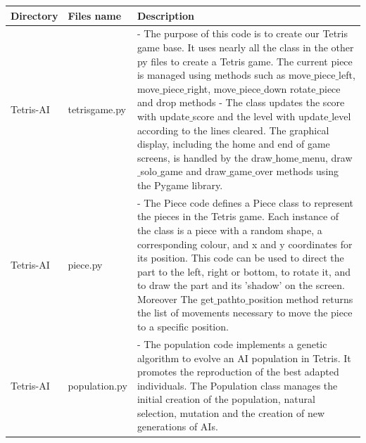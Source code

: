 \documentclass[conference]{IEEEtran}
\begin{document}
\begin{center}
\begin{tabular}{  | m{1.3cm} | m{1.7cm} | m{4.7cm} | } 
    \hline
     Directory & Files name & Description \\
    \hline
    Tetris-AI & 
    tetrisgame.py & 
    - The purpose of this code is to create our Tetris game base. It uses nearly all the  class in the other py files to create a Tetris game. The current piece is managed using methods such as move$\_$piece$\_$left, move$\_$piece$\_$right, move$\_$piece$\_$down  rotate$\_$piece and drop methods
    \newline- The class updates the score with update$\_$score and the level with update$\_$level according to the lines cleared. The graphical display, including the home and end of game screens, is handled by the draw$\_$home$\_$menu, draw$\_$solo$\_$game and draw$\_$game$\_$over methods using the Pygame\cite{b4} library. \\
     \hline
     Tetris-AI &
    piece.py & 
    - The Piece code defines a Piece class to represent the pieces in the Tetris game. Each instance of the class is a piece with a random shape, a corresponding colour, and x and y coordinates for its position. This code can be used to direct the part to the left, right or bottom, to rotate it, and to draw the part and its 'shadow' on the screen. Moreover The get$\_$pathto$\_$position method returns the list of movements necessary to move the piece to a specific position.\\
     \hline
    Tetris-AI & 
    population.py &
    - The population code implements a genetic algorithm to evolve an AI population in Tetris. It promotes the reproduction of the best adapted individuals. The Population class manages the initial creation of the population, natural selection, mutation and the creation of new generations of AIs.  
     
\end{tabular}
\end{center}
\end{document}
